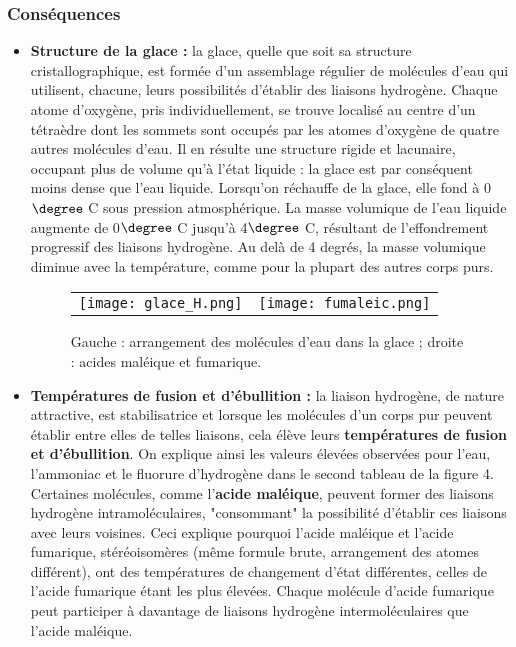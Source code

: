 \documentclass[11pt,a4paper]{report}
\begin{document}
\subsubsection{Conséquences}

\begin{itemize}
	\item \textbf{Structure de la glace :} la glace, quelle que soit sa structure 							cristallographique, est formée d'un assemblage régulier de molécules d'eau qui utilisent, 				chacune, leurs possibilités d'établir des liaisons hydrogène. Chaque atome d'oxygène, pris 				individuellement, se trouve localisé au centre d'un tétraèdre dont les sommets sont occupés par 		les atomes d'oxygène de quatre autres molécules d'eau. Il en résulte une structure rigide et 			lacunaire, occupant plus de volume qu'à l'état liquide : la glace est par conséquent moins dense 	que l'eau liquide. Lorsqu'on réchauffe de la glace, elle fond à 0$\degree$ C sous pression 				atmosphérique. La masse volumique de l'eau liquide augmente de 0$\degree$ C jusqu'à 4$\degree$ 			C, résultant de l'effondrement progressif des liaisons hydrogène. Au delà de 4 degrés, la masse 		volumique diminue avec la température, comme pour la plupart des autres corps purs.\\
	
	\begin{figure}[h!]
	\begin{center}
	\begin{tabular}{cc}
	\texttt{[image: glace\_H.png]}
	&
	\texttt{[image: fumaleic.png]}
	\end{tabular}
	\end{center}
	\caption{Gauche : arrangement des molécules d'eau dans la glace ; droite : acides maléique et 			fumarique.}
	\end{figure}	
	
	\item \textbf{Températures de fusion et d'ébullition :} la liaison hydrogène, de nature 				attractive, est stabilisatrice et lorsque les molécules d'un corps pur peuvent établir entre 			elles de telles liaisons, cela élève leurs \textbf{températures de fusion et d'ébullition}. On 			explique ainsi les valeurs élevées observées pour l'eau, l'ammoniac et le fluorure d'hydrogène 			dans le second tableau de la figure 4.\\
	
	Certaines molécules, comme l'\textbf{acide maléique}, peuvent former des liaisons hydrogène 			intramoléculaires, "consommant" la possibilité d'établir ces liaisons avec leurs voisines. Ceci 		explique pourquoi l'acide maléique et l'acide fumarique, stéréoisomères (même formule brute, 			arrangement des atomes différent), ont des températures de changement d'état différentes, celles 	de l'acide fumarique étant les plus élevées. Chaque molécule d'acide fumarique peut participer à 	davantage de liaisons hydrogène intermoléculaires que l'acide maléique.\\
	

\end{itemize}
\end{document}

